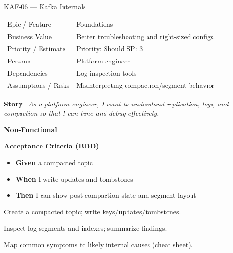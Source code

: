 \documentclass[11pt,a4paper]{article}
\newcommand{\Field}[2]{\textbf{#1}~#2}
\begin{document}
\begin{StoryCardBox}{KAF-06 --- Kafka Internals}
\begin{tabularx}{\linewidth}{LY}
 Epic / Feature & Foundations \\
 Business Value & Better troubleshooting and right-sized configs. \\
 Priority / Estimate & Priority: Should \quad SP: 3 \\
 Persona & Platform engineer \\
 Dependencies & Log inspection tools \\
 Assumptions / Risks & Misinterpreting compaction/segment behavior \\
\end{tabularx}

\medskip
\Field{Story}{\; \emph{As a platform engineer, I want to understand replication, logs, and compaction so that I can tune and debug effectively.}}

\medskip
\Field{Non-Functional}{\; \; }

\medskip
\Field{Acceptance Criteria (BDD)}{}
\begin{itemize}[leftmargin=1.2em, itemsep=1pt]
  \item \textbf{Given} a compacted topic
  \item \textbf{When} I write updates and tombstones
  \item \textbf{Then} I can show post-compaction state and segment layout
\end{itemize}

\begin{TasksBox}
\begin{tasklist}
  \item Create a compacted topic; write keys/updates/tombstones.
  \item Inspect log segments and indexes; summarize findings.
  \item Map common symptoms to likely internal causes (cheat sheet).
\end{tasklist}
\end{TasksBox}
\end{StoryCardBox}
\clearpage
\end{document}
